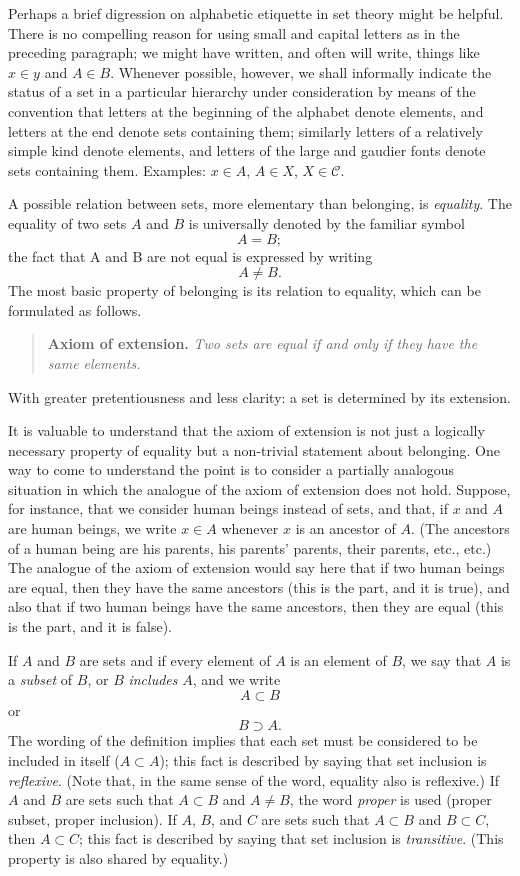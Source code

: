   Perhaps a brief digression on alphabetic etiquette in set theory might be helpful. 
 There is no compelling reason for using small and capital letters as in the preceding paragraph; we might have written, and often will write, things like $x \in y$ and $A \in B$. 
 Whenever possible, however, we shall informally indicate the status of a set in a particular hierarchy under consideration by means of the convention that letters at the beginning of the alphabet denote elements, and letters at the end denote sets containing them; similarly letters of a relatively simple kind denote elements, and letters of the large and gaudier fonts denote sets containing them. 
 Examples: $x \in A$, $A \in X$, $X \in \mathcal{C}$.


  A possible relation between sets, more elementary than belonging, is \textit{equality}. 
 The equality of two sets $A$ and $B$ is universally denoted by the familiar symbol  
\[ A = B; \]    the fact that A and B are not equal is expressed by writing  
\[ A \neq B. \]    
 The most basic property of belonging is its relation to equality, which can be formulated as follows.


  \begin{quote} 
 \textbf{Axiom of extension.} 
 \textit{Two sets are equal if and only if they have the same elements.} 
 \end{quote}


  With greater pretentiousness and less clarity: a set is determined by its extension.


  It is valuable to understand that the axiom of extension is not just a logically necessary property of equality but a non-trivial statement about belonging. 
 One way to come to understand the point is to consider a partially analogous situation in which the analogue of the axiom of extension does not hold. 
 Suppose, for instance, that we consider human beings instead of sets, and that, if $x$ and $A$ are human beings, we write $x \in A$ whenever $x$ is an ancestor of $A$. 
 (The ancestors of a human being are his parents, his parents' parents, their parents, etc., etc.) 
 The analogue of the axiom of extension would say here that if two human beings are equal, then they have the same ancestors (this is the  part, and it is true), and also that if two human beings have the same ancestors, then they are equal (this is the  part, and it is false).


  If $A$ and $B$ are sets and if every element of $A$ is an element of $B$, we say that $A$ is a \textit{subset} of $B$, or $B$ \textit{includes} $A$, and we write  
\[ A \subset B \]    or  
\[ B \supset A. \]    
 The wording of the definition implies that each set must be considered to be included in itself ($A \subset A$); this fact is described by saying that set inclusion is \textit{reflexive}. (Note that, in the same sense of the word, equality also is reflexive.) 
 If $A$ and $B$ are sets such that $A \subset B$ and $A \neq B$, the word \textit{proper} is used (proper subset, proper inclusion). 
 If $A$, $B$, and $C$ are sets such that $A \subset B$ and $B \subset C$, then $A \subset C$; this fact is described by saying that set inclusion is \textit{transitive}. 
 (This property is also shared by equality.)


